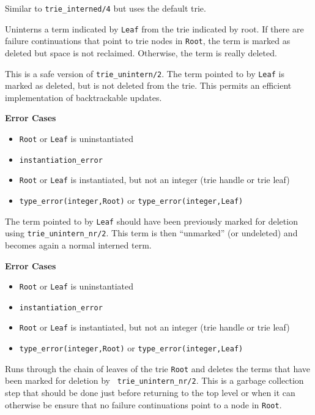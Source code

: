 {\begin{description}
Similar to {\tt trie\_interned/4}  but uses the default trie.

Uninterns a term indicated by {\tt Leaf} from the trie indicated by
root.  If there are failure continuations that point to trie nodes in
{\tt Root}, the term is marked as deleted but space is not reclaimed.
Otherwise, the term is really deleted.

This is a safe version of {\tt trie\_unintern/2}. The term pointed to by
{\tt Leaf} is marked as deleted, but is not deleted from the trie. This
permits an efficient implementation of backtrackable updates.

{\bf Error Cases}
\begin{itemize}
\item 	{\tt Root} or {\tt Leaf} is uninstantiated
\bi
\item 	 {\tt instantiation\_error}
\ei
\item 	{\tt Root} or {\tt Leaf} is instantiated, but not an integer
  (trie handle or trie leaf) 
\bi
\item 	 {\tt type\_error(integer,Root)} or {\tt type\_error(integer,Leaf)}
\ei
\end{itemize}

The term pointed to by {\tt Leaf} should have been previously marked for
deletion using
{\tt trie\_unintern\_nr/2}. This term is then ``unmarked'' (or undeleted)
and becomes again a normal interned term.

{\bf Error Cases}
\begin{itemize}
\item 	{\tt Root} or {\tt Leaf} is uninstantiated
\bi
\item 	 {\tt instantiation\_error}
\ei
\item 	{\tt Root} or {\tt Leaf} is instantiated, but not an integer
  (trie handle or trie leaf) 
\bi
\item 	 {\tt type\_error(integer,Root)} or {\tt type\_error(integer,Leaf)}
\ei
\end{itemize}

Runs through the chain of leaves of the trie {\tt Root} and deletes
the terms that have been marked for deletion by {\tt
  trie\_unintern\_nr/2}. This is a garbage collection step that should
be done just before returning to the top level or when it can
otherwise be ensure that no failure continuations point to a node in
{\tt Root}.


\end{description}}
